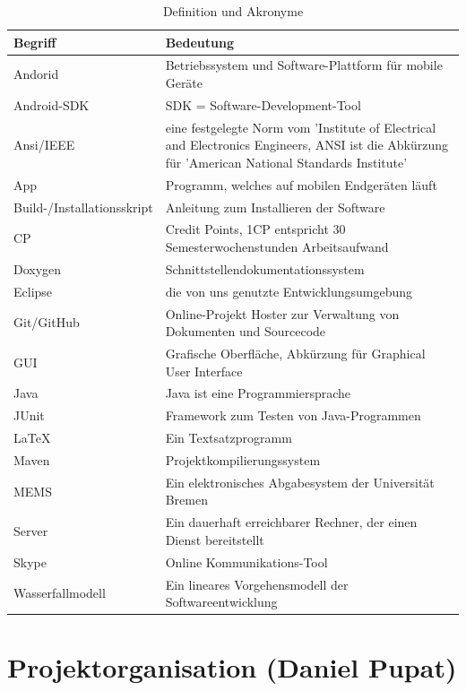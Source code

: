 \documentclass[fontsize=12pt,paper=a4,twoside]{scrartcl}
\begin{document}
\begin{table}[!h]
\caption{Definition und Akronyme}
\centering
\begin{tabular}{p{7cm}|p{7cm}}
\hline Begriff & Bedeutung\\ \hline
\hline Andorid & Betriebssystem und Software-Plattform für mobile Geräte\\
\hline Android-SDK & SDK = Software-Development-Tool\\
\hline Ansi/IEEE & eine festgelegte Norm vom 'Institute of Electrical and Electronics Engineers, ANSI ist die Abkürzung für 'American National Standards Institute'\\
\hline App & Programm, welches auf mobilen Endgeräten läuft\\
\hline Build-/Installationsskript & Anleitung zum Installieren der Software\\
\hline CP & Credit Points, 1CP entspricht 30 Semesterwochenstunden Arbeitsaufwand\\
\hline Doxygen & Schnittstellendokumentationssystem\\
\hline Eclipse & die von uns genutzte Entwicklungsumgebung\\
\hline Git/GitHub & Online-Projekt Hoster zur Verwaltung von Dokumenten und Sourcecode\\
\hline GUI & Grafische Oberfläche, Abkürzung für Graphical User Interface\\
\hline Java & Java ist eine Programmiersprache\\
\hline JUnit & Framework zum Testen von Java-Programmen\\
\hline \LaTeX & Ein Textsatzprogramm\\
\hline Maven & Projektkompilierungssystem\\
\hline MEMS & Ein elektronisches Abgabesystem der Universität Bremen\\
\hline Server & Ein dauerhaft erreichbarer Rechner, der einen Dienst bereitstellt\\
\hline Skype & Online Kommunikations-Tool\\
\hline Wasserfallmodell & Ein lineares Vorgehensmodell der Softwareentwicklung\\ 
\hline
\end{tabular}
\end{table}

\newpage

\section{Projektorganisation (Daniel Pupat)}
\end{document}
